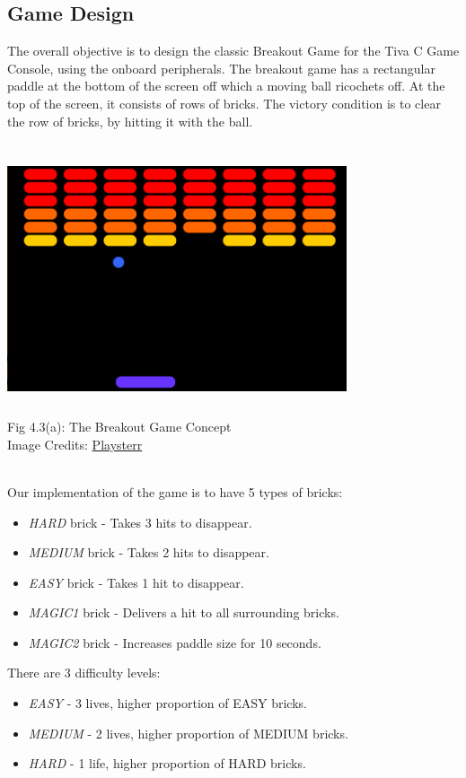 \documentclass[a4paper,12pt,oneside]{book}
\begin{document}
\subsection{Game Design}
\qquad The overall objective is to design the classic Breakout Game for the Tiva C Game Console, using the onboard peripherals.
The breakout game has a rectangular paddle at the bottom of the screen off which a moving ball ricochets off. At the top of the screen, it consists of rows of bricks. The victory condition is to clear the row of bricks, by hitting it with the ball. 
\begin{center}
\includegraphics[width=10cm, height=8cm]{BreakoutImages/BreakoutDesign} \\
\caption{Fig 4.3(a): The Breakout Game Concept \\ Image Credits: \href{http://playsterr.com/wp-content/uploads/2016/01/breakout-voyager_img1.png}{Playsterr}} 
\end{center}
\\ Our implementation of the game is to have 5 types of bricks:
\begin{itemize}
  \item \textit{HARD} brick - Takes 3 hits to disappear.
  \item \textit{MEDIUM} brick - Takes 2 hits to disappear.
  \item \textit{EASY} brick - Takes 1 hit to disappear.
  \item \textit{MAGIC1} brick - Delivers a hit to all surrounding bricks.
  \item \textit{MAGIC2} brick - Increases paddle size for 10 seconds.
\end{itemize}
There are 3 difficulty levels:
\begin{itemize}
  \item \textit{EASY} - 3 lives, higher proportion of EASY bricks.
  \item \textit{MEDIUM} - 2 lives, higher proportion of MEDIUM bricks.
  \item \textit{HARD} - 1 life, higher proportion of HARD bricks.
\end{itemize}
\end{document}
